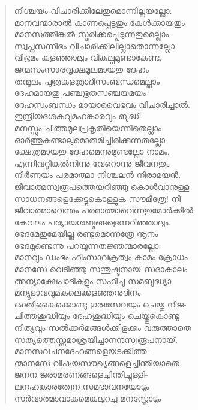 \begin{verse}
നിശ്ചയം വിചാരിക്കിലേതുമൊന്നില്ലയല്ലോ.\\
മാനവന്മാരാല്‍ കാണപ്പെട്ടതും കേള്‍ക്കായതും\\
മാനസത്തിങ്കല്‍ സ്മരിക്കപ്പെടുന്നതുമെല്ലാം\\
സ്വപ്നസന്നിഭം വിചാരിക്കിലില്ലാതൊന്നല്ലോ\\
വിഭ്രമം കളഞ്ഞാലും വികല്പമുണ്ടാകേണ്ട.\\
ജന്മസംസാരവൃക്ഷമൂലമായതു ദേഹം\\
തന്മൂലം പുത്രകളത്രാദിസംബന്ധമെല്ലാം\\
ദേഹമായതു പഞ്ചഭൂതസഞ്ചയമയം\\
ദേഹസംബന്ധം മായാവൈഭവം വിചാരിച്ചാല്‍.\\
ഇന്ദ്രിയദശകവുമഹങ്കാരവും ബുദ്ധി\\
മനസ്സും ചിത്തമൂലപ്രകൃതിയെന്നിതെല്ലാം\\
ഓര്‍ത്തുകണ്ടാലുമൊരുമിച്ചിരിക്കുന്നതല്ലോ\\
ക്ഷേത്രമായതു ദേഹമെന്നുമുണ്ടല്ലോ നാമം.\\
എന്നിവറ്റിങ്കല്‍നിന്നു വേറൊന്നു ജീവനതും\\
നിര്‍ണയം പരമാത്മാ നിശ്ചലന്‍ നിരാമയന്‍.\\
ജീവാത്മസ്വരൂപത്തെയറിഞ്ഞു കൊള്‍വാനുള്ള\\
സാധനങ്ങളെക്കേട്ടുകൊള്ളുക സൗമിത്രേ! നീ\\
ജീവാത്മാവെന്നും പരമാത്മാവെന്നതുമോര്‍ക്കില്‍\\
കേവലം പര്യായശബ്ദങ്ങളെന്നറിഞ്ഞാലും.\\
ഭേദമേതുമേയില്ല രണ്ടുമൊന്നത്രേ നൂനം\\
ഭേദമുണ്ടെന്നു പറയുന്നതജ്ഞന്മാരല്ലോ.\\
മാനവും ഡംഭം ഹിംസാവക്രത്വം കാമം ക്രോധം\\
മാനസേ വെടിഞ്ഞു സന്തുഷ്ടനായ് സദാകാലം\\
അന്യാക്ഷേപാദികളും സഹിചു സമബുദ്ധ്യാ\\
മന്യുഭാവവുമകലെക്കളഞ്ഞനുദിനം\\
ഭക്തികൈക്കൊണ്ടു ഗുരുസേവയും ചെയ്തു നിജ-\\
ചിത്തശുദ്ധിയും ദേഹശുദ്ധിയും ചെയ്തുകൊണ്ടു\\
നിത്യവും സല്‍ക്കര്‍മങ്ങള്‍ക്കിളക്കം വരുത്താതെ\\
സത്യത്തെസ്സമാശ്രയിച്ചാനന്ദസ്വരൂപനായ്.\\
മാനസവചനദേഹങ്ങളെയടക്കിത്ത-\\
ന്മാനസേ വിഷയസൗഖ്യങ്ങളെച്ചിന്തിയാതെ\\
ജനന ജരാമരണങ്ങളെച്ചിന്തിച്ചുള്ളി-\\
ലനഹങ്കാരത്വേന സമഭാവനയോടും\\
സര്‍വാത്മാവാകുമെങ്കലുറച്ച മനസ്സോടും\\

\end{verse}
